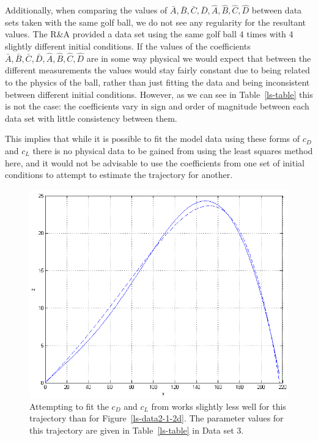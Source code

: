 Additionally, when comparing the values of $\bar{A}, \bar{B}, \bar{C}, \bar{D}, \hat{A}, \hat{B}, \hat{C}, \hat{D}$
between data sets taken with the same golf ball, we do not see any regularity for the resultant 
values. The R\&A provided a data set using the same golf ball 4 times with 4 slightly different
initial conditions. If the values of the coefficients $\bar{A}, \bar{B}, \bar{C}, \bar{D}, \hat{A}, \hat{B}, \hat{C}, \hat{D}$
are in some way physical we would expect that between the different measurements the values would stay fairly constant
due to being related to the physics of the ball, rather than just fitting the data and being inconsistent
between different initial conditions. However, as we can see in Table~\ref{ls-table} this is not the case:
the coefficients vary in sign and order of magnitude between each data set with little consistency between
them.

This implies that while it is possible to fit the model data using these forms of $c_D$ and $c_L$
there is no physical data to be gained from using the least squares method here, and it would not
be advisable to use the coefficients from one set of initial conditions to attempt to estimate the
trajectory for another.

\begin{figure}
\centering
\includegraphics[scale=0.6]{../images/ls-data2-3-2d.png}
\caption[Trajectory which least squares struggles to fit]{Attempting to fit the $c_D$ and $c_L$ from
\citet{Lieberman2001} works slightly less well for this trajectory than for Figure~\ref{ls-data2-1-2d}.
The parameter values for this trajectory are given in Table~\ref{ls-table} in Data set 3.}
\label{ls-data2-3-2d}
\end{figure}

